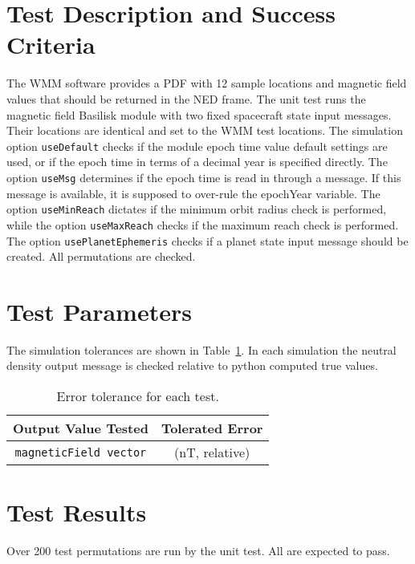 
\section{Test Description and Success Criteria}
The WMM software provides a PDF with 12 sample locations and magnetic field values that should be returned in the NED frame.  
The unit test runs the magnetic field Basilisk module with two fixed spacecraft state input messages.  Their locations are identical and set to the WMM test locations.  The simulation option {\tt useDefault} checks if the module epoch time value default settings are used, or if the epoch time in terms of a decimal year is specified directly. The option {\tt useMsg} determines if the epoch time is read in through a message.  If this message is available, it is supposed to over-rule the epochYear variable.  The option {\tt useMinReach} dictates if the minimum orbit radius check is performed, while the option {\tt useMaxReach} checks if the maximum reach check is performed.  The option {\tt usePlanetEphemeris} checks if a planet state input message should be created.  All permutations are checked.

\section{Test Parameters}
The simulation tolerances are shown in Table~\ref{tab:errortol}.  In each simulation the neutral density output message is checked relative to python computed true values.  
\begin{table}[htbp]
	\caption{Error tolerance for each test.}
	\label{tab:errortol}
	\centering \fontsize{10}{10}\selectfont
	\begin{tabular}{ c | c } %
		\hline\hline
		\textbf{Output Value Tested}  & \textbf{Tolerated Error}  \\ 
		\hline
		{\tt magneticField vector}        &  (nT, relative) \\ 
		\hline\hline
	\end{tabular}
\end{table}




\section{Test Results}
Over 200 test permutations are run by the unit test.  All are expected to pass.





